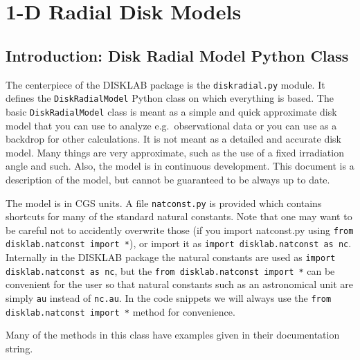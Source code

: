\documentclass{book}
\newcommand{\code}[1]{{\small\tt #1}}
\begin{document}
\part{1-D Radial Disk Models}\label{part-radial-disk}

\chapter{Introduction: Disk Radial Model Python Class}
\label{chap-diskradialmodel-class}
The centerpiece of the {\sf DISKLAB} package is the \code{diskradial.py}
module. It defines the \code{DiskRadialModel} Python class on which everything
is based. The basic \code{DiskRadialModel} class is meant as a simple and
quick approximate disk model that you can use to analyze e.g.\ observational
data or you can use as a backdrop for other calculations. It is not meant as a
detailed and accurate disk model. Many things are very approximate, such as the
use of a fixed irradiation angle and such. Also, the model is in continuous
development. This document is a description of the model, but cannot be guaranteed
to be always up to date.

The model is in CGS units. A file \code{natconst.py} is provided which contains
shortcuts for many of the standard natural constants. Note that one may want to
be careful not to accidently overwrite those (if you import natconst.py using
\code{from disklab.natconst import *}), or import it as \code{import
  disklab.natconst as nc}. Internally in the {\sf DISKLAB} package the
natural constants are used as \code{import
  disklab.natconst as nc}, but the \code{from disklab.natconst import *} can
be convenient for the user so that natural constants such as an astronomical
unit are simply \code{au} instead of \code{nc.au}. In the code snippets we
will always use the \code{from disklab.natconst import *} method for
convenience.

Many of the methods in this class have examples given in their documentation
string.
\end{document}
